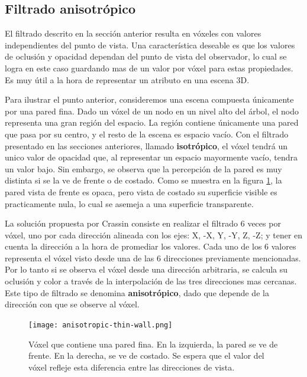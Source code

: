 
\subsection{Filtrado anisotrópico}

El filtrado descrito en la sección anterior resulta en vóxeles con valores independientes del punto de vista.
Una característica deseable es que los valores de oclusión y opacidad dependan del punto de vista del observador, lo cual se logra en este caso guardando mas de un valor por vóxel para estas propiedades.
Es muy útil a la hora de representar un atributo en una escena 3D.

Para ilustrar el punto anterior, consideremos una escena compuesta únicamente por una pared fina.
Dado un vóxel de un nodo en un nivel alto del árbol, el nodo representa una gran región del espacio.
La región contiene únicamente una pared que pasa por su centro, y el resto de la escena es espacio vacío.
Con el filtrado presentado en las secciones anteriores, llamado \textbf{isotrópico}, el vóxel tendrá un unico valor de opacidad que, al representar un espacio mayormente vacío, tendra un valor bajo.
Sin embargo, se observa que la percepción de la pared es muy distinta si se la ve de frente o de costado.
Como se muestra en la figura \ref{fig:anisotropic-thin-wall}, la pared vista de frente es opaca, pero vista de costado su superficie visible es practicamente nula, lo cual se asemeja a una superficie transparente.

La solución propuesta por Crassin \cite{voxel-cone-tracing} consiste en realizar el filtrado 6 veces por vóxel, uno por cada dirección alineada con los ejes: X, -X, Y, -Y, Z, -Z; y tener en cuenta la dirección a la hora de promediar los valores.
Cada uno de los 6 valores representa el vóxel visto desde una de las 6 direcciones previamente mencionadas. Por lo tanto si se observa el vóxel desde una dirección arbitraria, se calcula su oclusión y color a través de la interpolación de las tres direcciones mas cercanas.
Este tipo de filtrado se denomina \textbf{anisotrópico}, dado que depende de la dirección con que se observe al vóxel.

\begin{figure}
    \centering
    \texttt{[image: anisotropic-thin-wall.png]}
    \caption{
        Vóxel que contiene una pared fina.
        En la izquierda, la pared se ve de frente.
        En la derecha, se ve de costado.
        Se espera que el valor del vóxel refleje esta diferencia entre las direcciones de vista.
    }
    \label{fig:anisotropic-thin-wall}
\end{figure}

